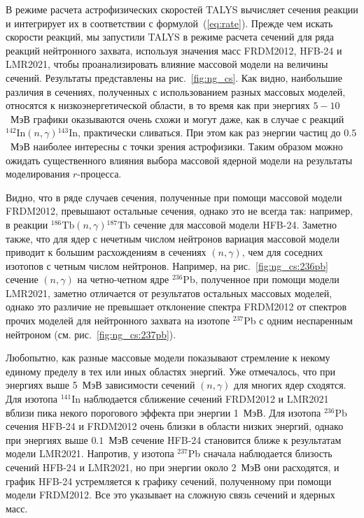 В режиме расчета астрофизических скоростей TALYS вычисляет сечения реакции и интегрирует их в соответствии с формулой~(\ref{eq:rate}). Прежде чем искать скорости реакций, мы запустили TALYS в режиме расчета сечений для ряда реакций нейтронного захвата, используя значения масс FRDM2012, HFB-24 и LMR2021, чтобы проанализировать влияние массовой модели на величины сечений. Результаты представлены на рис.~\ref{fig:ng_cs}. Как видно, наибольшие различия в сечениях, полученных с использованием разных массовых моделей, относятся к низкоэнергетической области, в то время как при энергиях $5-10$~МэВ графики оказываются очень схожи и могут даже, как в случае с реакций ${}^{142}\text{In}(n,\gamma){}^{143}\text{In}$, практически сливаться. При этом как раз энергии частиц до $0.5$~МэВ наиболее интересны с точки зрения астрофизики. Таким образом можно ожидать существенного влияния выбора массовой ядерной модели на результаты моделирования $r$-процесса.

Видно, что в ряде случаев сечения, полученные при помощи массовой модели FRDM2012, превышают остальные сечения, однако это не всегда так: например, в реакции  ${}^{186}\text{Tb}(n,\gamma){}^{187}\text{Tb}$ сечение для массовой модели HFB-24. Заметно также, что для ядер с нечетным числом нейтронов вариация массовой модели приводит к большим расхождениям в сечениях $(n,\gamma)$, чем для соседних изотопов с четным числом нейтронов. Например, на рис.~\ref{fig:ng_cs:236pb} сечение $(n,\gamma)$ на четно-четном ядре ${}^{236}$Pb, полученное при помощи модели LMR2021, заметно отличается от результатов остальных массовых моделей, однако это различие не превышает отклонение спектра FRDM2012 от спектров прочих моделей для нейтронного захвата на изотопе ${}^{237}$Pb с одним неспаренным нейтроном (см. рис.~\ref{fig:ng_cs:237pb}).

Любопытно, как разные массовые модели показывают стремление к некому единому пределу в тех или иных областях энергий. Уже отмечалось, что при энергиях выше 5~МэВ зависимости сечений $(n,\gamma)$ для многих ядер сходятся. Для изотопа ${}^{141}$In наблюдается сближение сечений FRDM2012 и LMR2021 вблизи пика некого порогового эффекта при энергии 1~МэВ. Для изотопа ${}^{236}$Pb сечения HFB-24 и FRDM2012 очень близки в области низких энергий, однако при энергиях выше $0.1$~МэВ сечение HFB-24 становится ближе к результатам модели LMR2021. Напротив, у изотопа ${}^{237}$Pb сначала наблюдается близость сечений HFB-24 и LMR2021, но при энергии около 2~МэВ они расходятся, и график HFB-24 устремляется к графику сечений, полученному при помощи модели FRDM2012. Все это указывает на сложную связь сечений и ядерных масс.

